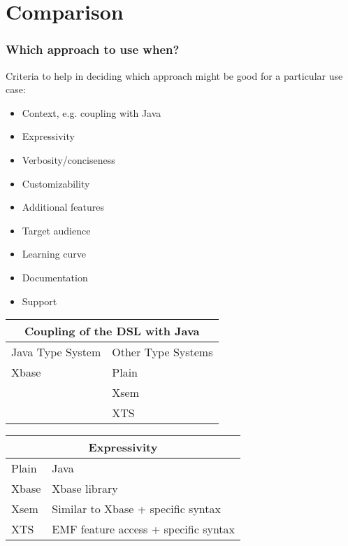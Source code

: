 \section{Comparison}

\begin{frame}
  \frametitle{Which approach to use when?}
  
  Criteria to help in deciding which approach might be good for a particular use
  case:
  \begin{itemize}
    \item Context, e.g. coupling with Java
    \item Expressivity
    \item Verbosity/conciseness
    \item Customizability
    \item Additional features
    \item Target audience
    \item Learning curve
    \item Documentation
    \item Support
  \end{itemize}

\framebreak  
\begin{tabularx}{\linewidth}{ X   X }
\multicolumn{2}{c}{Coupling of the DSL with Java} \\ \hline
Java Type System & Other Type Systems \\ \hline
Xbase & Plain  \\
& Xsem  \\
& XTS  \\
\end{tabularx}


\framebreak
\begin{tabularx}{\linewidth}{ l   X }
\multicolumn{2}{c}{Expressivity} \\ \hline
Plain & Java \\
Xbase & Xbase library \\
Xsem & Similar to Xbase + specific syntax\\
XTS & EMF feature access + specific syntax\\
\end{tabularx}


\end{frame}
